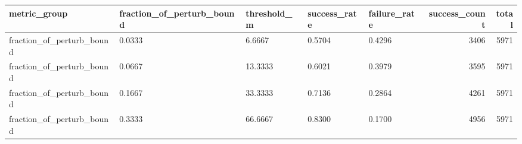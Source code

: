 \begin{tabular}{lllllrr}
\toprule
metric_group & fraction_of_perturb_bound & threshold_m & success_rate & failure_rate & success_count & total \\
\midrule
fraction_of_perturb_bound & 0.0333 & 6.6667 & 0.5704 & 0.4296 & 3406 & 5971 \\
fraction_of_perturb_bound & 0.0667 & 13.3333 & 0.6021 & 0.3979 & 3595 & 5971 \\
fraction_of_perturb_bound & 0.1667 & 33.3333 & 0.7136 & 0.2864 & 4261 & 5971 \\
fraction_of_perturb_bound & 0.3333 & 66.6667 & 0.8300 & 0.1700 & 4956 & 5971 \\
\bottomrule
\end{tabular}
